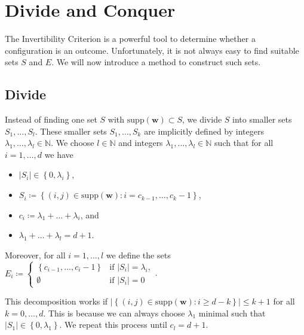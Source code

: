 \section{Divide and Conquer}\label{sec:divide-and-conquer}

The Invertibility Criterion is a powerful tool to determine whether a configuration is an outcome. Unfortunately, it is not always easy to find suitable sets \( S \) and \( E \). We will now introduce a method to construct such sets.

\subsection*{Divide}\label{subsec:divide}

Instead of finding one set \( S \) with \( \mathrm{supp}(\mathbf w) \subset S \), we divide \( S \) into smaller sets \( S_1, \dots, S_l \). These smaller sets \( S_1, \dots, S_k \) are implicitly defined by integers \( \lambda_1, \dots, \lambda_l \in \mathbb{N} \). We choose \( l \in \mathbb{N} \) and integers \( \lambda_1, \dots, \lambda_l \in \mathbb{N} \) such that for all \( i=1, \dots, d \) we have 
\begin{itemize}
    \item \( \lvert S_i \rvert \in \left\{ 0, \lambda_i \right\} \), 
    \item \( S_i \coloneqq \left\{ (i,j) \in \mathrm{supp}(\mathbf w) : i = c_{k-1}, \dots, c_k - 1 \right\} \),
    \item  \( c_i \coloneqq \lambda_1 + \dots + \lambda_i\), and
    \item \(  \lambda_1 + \dots + \lambda_l = d+1 \).
\end{itemize}
Moreover, for all \( i=1, \dots, l \) we define the sets \( E_i \coloneqq \begin{cases}
    \left\{ c_{i-1}, \dots, c_i - 1 \right\} & \text{if } \lvert S_i \rvert = \lambda_i, \\
    \emptyset & \text{if } \lvert S_i \rvert = 0
\end{cases} \).

\begin{remark}\label{rem:ksldmfiewonowiniew}
This decomposition works if \( \lvert \left\{ (i,j) \in \mathrm{supp}(\mathbf{w}) : i \geq d-k \right\} \rvert \leq k+1 \) for all \( k = 0, \dots, d \). This is because we can always choose \( \lambda_1  \) minimal such that \( \lvert S_1 \rvert \in \left\{ 0, \lambda_1 \right\} \). We repeat this process until \( c_l = d+1 \). 
\end{remark}

